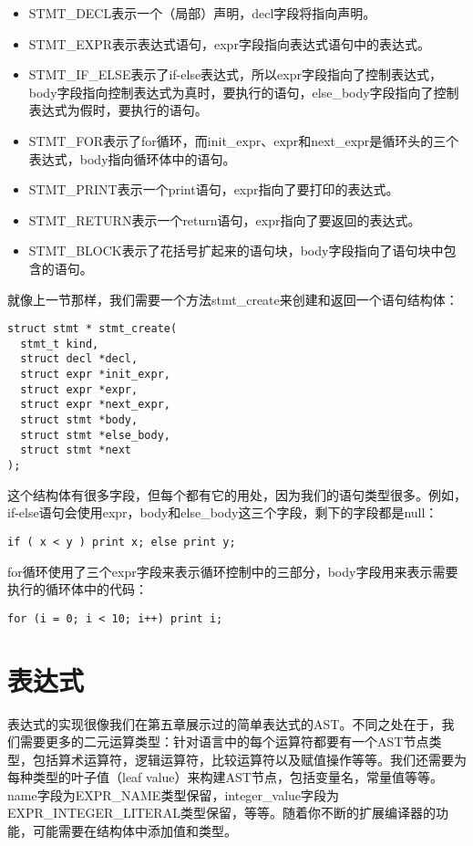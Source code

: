 \documentclass[cn,11pt,chinese]{elegantbook}
\begin{document}
\begin{itemize}
  \item STMT\_DECL表示一个（局部）声明，decl字段将指向声明。
  \item STMT\_EXPR表示表达式语句，expr字段指向表达式语句中的表达式。
  \item STMT\_IF\_ELSE表示了if-else表达式，所以expr字段指向了控制表达式，body字段指向控制表达式为真时，要执行的语句，else\_body字段指向了控制表达式为假时，要执行的语句。
  \item STMT\_FOR表示了for循环，而init\_expr、expr和next\_expr是循环头的三个表达式，body指向循环体中的语句。
  \item STMT\_PRINT表示一个print语句，expr指向了要打印的表达式。
  \item STMT\_RETURN表示一个return语句，expr指向了要返回的表达式。
  \item STMT\_BLOCK表示了花括号扩起来的语句块，body字段指向了语句块中包含的语句。
\end{itemize}

就像上一节那样，我们需要一个方法stmt\_create来创建和返回一个语句结构体：

\begin{verbatim}
struct stmt * stmt_create(
  stmt_t kind,
  struct decl *decl,
  struct expr *init_expr,
  struct expr *expr,
  struct expr *next_expr,
  struct stmt *body,
  struct stmt *else_body,
  struct stmt *next
);
\end{verbatim}

这个结构体有很多字段，但每个都有它的用处，因为我们的语句类型很多。例如，if-else语句会使用expr，body和else\_body这三个字段，剩下的字段都是null：

\begin{verbatim}
if ( x < y ) print x; else print y;
\end{verbatim}

for循环使用了三个expr字段来表示循环控制中的三部分，body字段用来表示需要执行的循环体中的代码：

\begin{verbatim}
for (i = 0; i < 10; i++) print i;
\end{verbatim}

\section{表达式}

表达式的实现很像我们在第五章展示过的简单表达式的AST。不同之处在于，我们需要更多的二元运算类型：针对语言中的每个运算符都要有一个AST节点类型，包括算术运算符，逻辑运算符，比较运算符以及赋值操作等等。我们还需要为每种类型的叶子值（leaf value）来构建AST节点，包括变量名，常量值等等。name字段为EXPR\_NAME类型保留，integer\_value字段为EXPR\_INTEGER\_LITERAL类型保留，等等。随着你不断的扩展编译器的功能，可能需要在结构体中添加值和类型。
\end{document}
